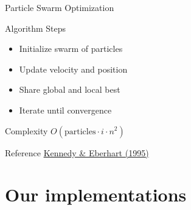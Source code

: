 \documentclass[aspectratio=169]{beamer}
\begin{document}
\begin{frame}{Particle Swarm Optimization}

\begin{block}{Algorithm Steps}
\begin{itemize}
\item Initialize swarm of particles
\item Update velocity and position
\item Share global and local best
\item Iterate until convergence
\end{itemize}
\end{block}

\begin{exampleblock}{Complexity}
$O(\text{particles} \cdot i \cdot n^2)$
\end{exampleblock}

\begin{alertblock}{Reference}
\href{https://ieeexplore.ieee.org/document/488968}{Kennedy \& Eberhart (1995)}
\end{alertblock}

\end{frame}

\section{Our implementations}
\end{document}
